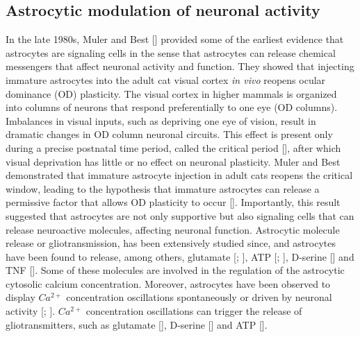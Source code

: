 \subsection{Astrocytic modulation of neuronal activity}
\label{chap1:sec:2:subsec3:astro_neuromodulation}
In the late 1980s, Muler and Best [\cite{muller1989ocular}] provided some of the earliest evidence that astrocytes are signaling cells in the sense that astrocytes can release chemical messengers that affect neuronal activity and function. 
They showed that injecting immature astrocytes into the adult cat visual cortex \textit{in vivo} reopens ocular dominance (OD) plasticity.
The visual cortex in higher mammals is organized into columns of neurons that respond preferentially to one eye (OD columns).
Imbalances in visual inputs, such as depriving one eye of vision, result in dramatic changes in OD column neuronal circuits. 
This effect is present only during a precise postnatal time period, called the critical period [\cite{wiesel1963single}], after which visual deprivation has little or no effect on neuronal plasticity.
Muler and Best demonstrated that immature astrocyte injection in adult cats reopens the critical window, leading to the hypothesis that immature astrocytes can release a permissive factor that allows OD plasticity to occur [\cite{muller1989ocular}].
Importantly, this result suggested that astrocytes are not only supportive but also signaling cells that can release neuroactive molecules, affecting neuronal function.
Astrocytic molecule release or gliotransmission, has been extensively studied since, and astrocytes have been found to release, among others, glutamate [\cite{parpura1994glutamate}; \cite{bezzi1998prostaglandins}], ATP [\cite{cotrina1998connexins}; \cite{coco2003storage}], D-serine [\cite{mothet2000d}] and TNF [\cite{stellwagen2006synaptic}].
Some of these molecules are involved in the regulation of the astrocytic cytosolic calcium concentration.
Moreover, astrocytes have been observed to display $Ca^{2+}$ concentration oscillations spontaneously or driven by neuronal activity [\cite{cornell-bell1990}; \cite{charles1991intercellular}].
$Ca^{2+}$ concentration oscillations can trigger the release of gliotransmitters, such as glutamate [\cite{parpura1994glutamate}], D-serine [\cite{mothet2005glutamate}] and ATP [\cite{coco2003storage}].
